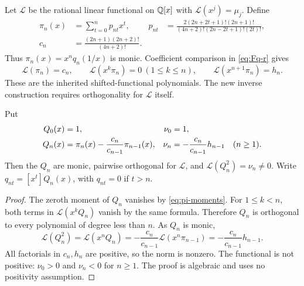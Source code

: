 Let $\mathcal L$ be the rational linear functional on $\mathbb Q[x]$ with
$\mathcal L(x^j)=\mu_j$. Define
\begin{align}
 \pi_n(x)&=\sum_{t=0}^n p_{nt}x^t,
 &p_{nt}&=
 \frac{2(2n+2t+1)!(2n+1)!}
 {(4n+2)!(2n-2t+1)!(2t)!},
 \label{eq:pi-coeff}\\
 c_n&=\frac{(2n+1)(2n+2)!}{(4n+2)!}.
 \label{eq:cn}
\end{align}
Thus $\pi_n(x)=x^nq_n(1/x)$ is monic. Coefficient comparison in
\eqref{eq:Fq-r} gives
\begin{equation}\label{eq:pi-moments}
 \mathcal L(\pi_n)=c_n,\qquad
 \mathcal L(x^k\pi_n)=0\ (1\leq k\leq n),\qquad
 \mathcal L(x^{n+1}\pi_n)=h_n.
\end{equation}
These are the inherited shifted-functional polynomials. The new inverse
construction requires orthogonality for $\mathcal L$ itself.

\begin{lemma}
\label{lem:Qorthogonal}
Put
\begin{align}
 Q_0(x)&=1,&\nu_0&=1,\notag\\
 Q_n(x)&=\pi_n(x)-\frac{c_n}{c_{n-1}}\pi_{n-1}(x),
 &\nu_n&=-\frac{c_n}{c_{n-1}}h_{n-1}\quad(n\geq1).
 \label{eq:Qnu}
\end{align}
Then the $Q_n$ are monic, pairwise orthogonal for $\mathcal L$, and
$\mathcal L(Q_n^2)=\nu_n\ne0$. Write
$q_{nt}=[x^t]Q_n(x)$, with $q_{nt}=0$ if $t>n$.
\end{lemma}
\begin{proof}
The zeroth moment of $Q_n$ vanishes by \eqref{eq:pi-moments}.
For $1\leq k<n$, both terms in
$\mathcal L(x^kQ_n)$ vanish by the same formula. Therefore $Q_n$
is orthogonal to every polynomial of degree less than $n$.
As $Q_n$ is monic,
\[
 \mathcal L(Q_n^2)=\mathcal L(x^nQ_n)
 =-\frac{c_n}{c_{n-1}}\mathcal L(x^n\pi_{n-1})
 =-\frac{c_n}{c_{n-1}}h_{n-1}.
\]
All factorials in $c_n,h_n$ are positive, so the norm is nonzero.
The functional is not positive: $\nu_0>0$ and $\nu_n<0$ for
$n\geq1$. The proof is algebraic and uses no positivity assumption.
\end{proof}

